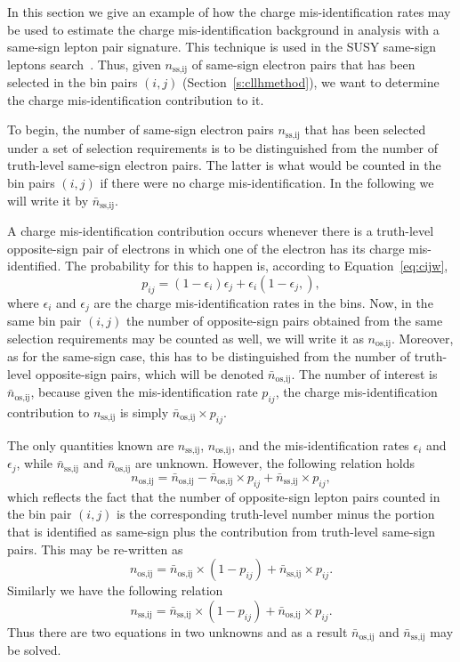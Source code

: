 In this section we give an example of how the charge mis-identification rates
may be used to estimate the charge mis-identification background in analysis
with a same-sign lepton pair signature. This technique is used in the SUSY
same-sign leptons search~\cite{ssssleptons}. Thus, given $n_{\text{ss,ij}}$ of
same-sign electron pairs that has been selected in the bin pairs $(i,j)$
(Section~\ref{s:cllhmethod}), we want to determine the charge
mis-identification contribution to it.


To begin, the number of same-sign electron pairs $n_{\text{ss,ij}}$ that has
been selected under a set of selection requirements is to be distinguished from
the number of truth-level same-sign electron pairs. The latter is what would be
counted in the bin pairs $(i,j)$ if there were no charge mis-identification. In
the following we will write it by $\bar{n}_{\text{ss,ij}}$.

A charge mis-identification contribution occurs whenever there is a truth-level
opposite-sign pair of electrons in which one of the electron has its charge
mis-identified. The probability for this to happen is, according to
Equation~\ref{eq:cijw},
%
$$p_{ij} = (1-\epsilon_i)\epsilon_j +  \epsilon_i(1-\epsilon_j,),$$
%
where $\epsilon_i$ and $\epsilon_j$ are the charge mis-identification rates in
the bins. Now, in the same bin pair $(i,j)$ the number of opposite-sign pairs
obtained from the same selection requirements may be counted as well, we will write
it as $n_{\text{os,ij}}$. Moreover, as for the same-sign case, this has to be
distinguished from the number of truth-level opposite-sign pairs, which will be
denoted $\bar{n}_{\text{os,ij}}$. The number of interest is
$\bar{n}_{\text{os,ij}}$, because given the mis-identification rate $p_{ij}$,
the charge mis-identification contribution to $n_{\text{ss,ij}}$ is simply
$\bar{n}_{\text{os,ij}}\times p_{ij}$.


The only quantities known are $n_{\text{ss,ij}}$, $n_{\text{os,ij}}$, and the
mis-identification rates $\epsilon_i$ and $\epsilon_j$, while
$\bar{n}_{\text{ss,ij}}$ and $\bar{n}_{\text{os,ij}}$ are unknown. However, the
following relation holds
%
$$n_{\text{os,ij}} = \bar{n}_{\text{os,ij}} - \bar{n}_{\text{os,ij}}\times
	p_{ij} + \bar{n}_{\text{ss,ij}}\times p_{ij},$$
%
which reflects the fact that the number of opposite-sign lepton pairs counted
in the bin pair $(i,j)$ is the corresponding truth-level number minus the portion
that is identified as same-sign plus the contribution from truth-level same-sign
pairs. This may be re-written as
$$ n_{\text{os,ij}} = \bar{n}_{\text{os,ij}}\times (1 - p_{ij}) +
	\bar{n}_{\text{ss,ij}} \times p_{ij}. $$
Similarly we have the following relation
$$ n_{\text{ss,ij}} = \bar{n}_{\text{ss,ij}}\times (1 - p_{ij}) +
	\bar{n}_{\text{os,ij}} \times p_{ij}.$$
Thus there are two equations in two unknowns and as a result
$\bar{n}_{\text{os,ij}}$ and $\bar{n}_{\text{ss,ij}}$ may be solved.

